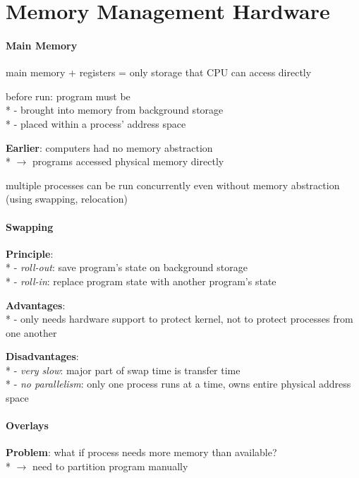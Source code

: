 \section{Memory Management Hardware}

\paragraph{Main Memory}
\begin{items}
  \item main memory + registers = only storage that CPU can access directly
  \item before run: program must be \\*
    - brought into memory from background storage \\*
    - placed within a process' address space
  \item \textbf{Earlier}: computers had no memory abstraction \\*
    \( \to \) programs accessed physical memory directly
  \item multiple processes can be run concurrently even without memory abstraction (using swapping, relocation)
\end{items}

\paragraph{Swapping}
\begin{items}
  \item \textbf{Principle}: \\*
    - \emph{roll-out}: save program's state on background storage \\*
    - \emph{roll-in}: replace program state with another program's state
  \item \textbf{Advantages}: \\*
    - only needs hardware support to protect kernel, not to protect processes from one another
  \item \textbf{Disadvantages}: \\*
    - \emph{very slow}: major part of swap time is transfer time \\*
    - \emph{no parallelism}: only one process runs at a time, owns entire physical address space
\end{items}

\paragraph{Overlays}
\begin{items}
  \item \textbf{Problem}: what if process needs more memory than available? \\*
    \( \to \) need to partition program manually
\end{items}

